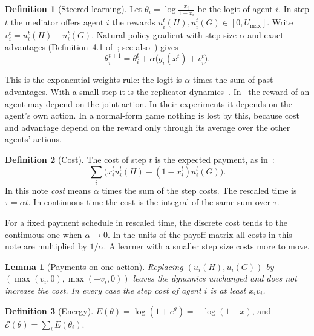 \documentclass[11pt,a4paper]{article}
\theoremstyle{definition}
\newtheorem{definition}{Definition}
\theoremstyle{plain}
\newtheorem{lemma}{Lemma}
\newcommand{\En}{\mathcal{E}}
\begin{document}
\begin{definition}[Steered learning]\label{def:npg}
Let $\theta_i=\log\frac{x_i}{1-x_i}$ be the logit of agent $i$. In step $t$ the mediator offers agent $i$ the rewards $u_i^t(H),u_i^t(G)\in[0,U_{\max}]$. Write $v_i^t=u_i^t(H)-u_i^t(G)$. Natural policy gradient with step size $\alpha$ and exact advantages (Definition~4.1 of~\cite{huang2025}; see also~\cite{kakade2001,agarwal2021}) gives
\begin{equation}\label{eq:update}
\theta_i^{t+1}=\theta_i^{t}+\alpha\bigl(g_i(x^t)+v_i^t\bigr).
\end{equation}
\end{definition}

This is the exponential-weights rule: the logit is $\alpha$ times the sum of past advantages. With a small step it is the replicator dynamics~\cite{sato2003,bloembergen2015,mertikopoulos2016}. In~\cite{huang2025} the reward of an agent may depend on the joint action. In their experiments it depends on the agent's own action. In a normal-form game nothing is lost by this, because cost and advantage depend on the reward only through its average over the other agents' actions.

\begin{definition}[Cost]\label{def:cost}
The cost of step $t$ is the expected payment, as in~\cite{huang2025}:
\[
\sum_i\bigl(x_i^tu_i^t(H)+(1-x_i^t)u_i^t(G)\bigr).
\]
In this note \emph{cost} means $\alpha$ times the sum of the step costs. The rescaled time is $\tau=\alpha t$. In continuous time the cost is the integral of the same sum over $\tau$.
\end{definition}

For a fixed payment schedule in rescaled time, the discrete cost tends to the continuous one when $\alpha\to0$. In the units of the payoff matrix all costs in this note are multiplied by $1/\alpha$. A learner with a smaller step size costs more to move.

\begin{lemma}[Payments on one action]\label{lem:one}
Replacing $(u_i(H),u_i(G))$ by $(\max(v_i,0),\max(-v_i,0))$ leaves the dynamics unchanged and does not increase the cost. In every case the step cost of agent $i$ is at least $x_iv_i$.
\end{lemma}

\begin{definition}[Energy]\label{def:energy}
$E(\theta)=\log(1+e^{\theta})=-\log(1-x)$, and $\En(\theta)=\sum_iE(\theta_i)$.
\end{definition}
\end{document}
